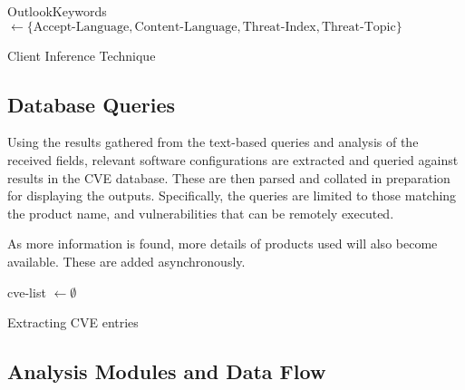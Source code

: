 \begin{algorithm}
    OutlookKeywords ${}\gets\{ \text{Accept-Language}, \text{Content-Language}, \text{Threat-Index}, \text{Threat-Topic} \}$\;
	\caption{Client Inference Technique}
	\label{alg:inf}
\end{algorithm}


\subsection{Database Queries}

Using the results gathered from the text-based queries and analysis of the
received fields, relevant software configurations are extracted and queried
against results in the CVE database.  These are then parsed and collated in
preparation for displaying the outputs. Specifically, the queries are limited
to those matching the product name, and vulnerabilities that can be remotely
executed.

As more information is found, more details of products used will also become
available.  These are added asynchronously.

\begin{algorithm}
	cve-list $\gets\emptyset$\;
	\;
	\caption{Extracting CVE entries}
\end{algorithm}

\subsection{Analysis Modules and Data Flow}

